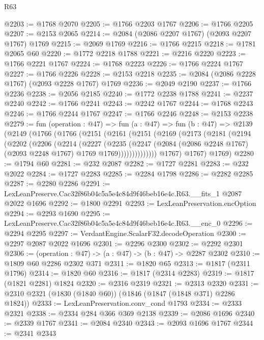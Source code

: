 \begin{lexlean}{R63}
\begin{coremodule}
@2203 := @1768 @2070
@2205 := @1766 @2203 @1767
@2206 := @1766 @2205
@2207 := @2153 @2065
@2214 := @2084 (@2086 @2207 @1767) (@2093 @2207 @1767) @1769
@2215 := @2069 @1769
@2216 := @1766 @2215
@2218 := @1781 @2065 @60
@2220 := @1772 @2218 @1788
@2221 := @2216 @2220
@2223 := @1766 @2221 @1767
@2224 := @1768 @2223
@2226 := @1766 @2224 @1767
@2227 := @1766 @2226
@2228 := @2153 @2218
@2235 := @2084 (@2086 @2228 @1767) (@2093 @2228 @1767) @1769
@2236 := @2049 @2190
@2237 := @1766 @2236
@2238 := @2056 @2185
@2240 := @1772 @2238 @1788
@2241 := @2237 @2240
@2242 := @1766 @2241
@2243 := @2242 @1767
@2244 := @1768 @2243
@2246 := @1766 @2244 @1767
@2247 := @1766 @2246
@2248 := @2153 @2238
@2279 := fun (operation : @47) =>
  fun (a : @47) =>
  fun (b : @47) =>
  @2139
    (@2149
      (@1766
        (@1766
          (@2151
            (@2161
              (@2151
                (@2169
                  (@2173
                    (@2181
                      (@2194
                        (@2202
                          (@2206
                            (@2214
                              (@2227
                                (@2235
                                  (@2247
                                    (@2084
                                      (@2086 @2248 @1767)
                                      (@2093 @2248 @1767)
                                      @1769
                                      @1769))))))))))))))
          @1767)
        @1767)
      @1769)
@2280 := @1794 @60
@2281 := @232 @2087
@2282 := @1727 @2281
@2283 := @232 @2022
@2284 := @1727 @2283
@2285 := @2284 @1798
@2286 := @2282 @2285
@2287 := @2280 @2286
@2291 := LexLeanPreserve.Cac32f86b04c5a5e4c84d9f46beb16e4c.R63.__fits_1 @2087 @2022 @1696
@2292 := @1800 @2291
@2293 := LexLeanPreservation.encOption
@2294 := @2293 @1690
@2295 := LexLeanPreserve.Cac32f86b04c5a5e4c84d9f46beb16e4c.R63.__enc_0
@2296 := @2294 @2295
@2297 := VerdantEngine.ScalarF32.decodeOperation
@2300 := @2297 @2087 @2022 @1696
@2301 := @2296 @2300
@2302 := @2292 @2301
@2306 := (operation : @47) -> (a : @47) -> (b : @47) -> @2287 @2302
@2310 := @1809 @60 @2286 @2302 @371
@2311 := @1820 @65
@2313 := @1817 (@2311 @1796)
@2314 := @1820 @60
@2316 := @1817 (@2314 @2283)
@2319 := @1817 (@1821 @2281) @1824
@2320 := @2316 @2319
@2321 := @2313 @2320
@2331 := @2310 @2321 (@1830 (@1840 @60)) (@1846 (@1847 (@1848 @371) @2286 @1824))
@2333 := LexLeanPreservation.conv_cond @1793
@2334 := @2333 @2321
@2338 := @2334 @284 @366 @369 @2138
@2339 := @2086 @1696
@2340 := @2339 @1767
@2341 := @2084 @2340
@2343 := @2093 @1696 @1767
@2344 := @2341 @2343

\end{coremodule}
\end{lexlean}

